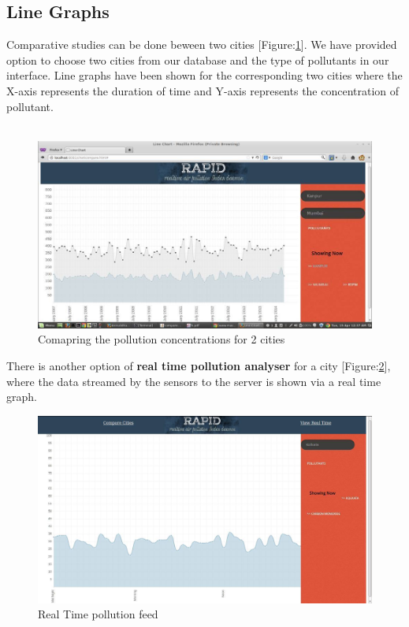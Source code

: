 \documentclass[twocolumn]{article}
\begin{document}
\subsection{Line Graphs}
Comparative studies can be done beween two cities [Figure:\ref{fig:compare}]. We have provided option to choose two cities from our database and the type of pollutants in our interface. Line graphs have been shown for the corresponding two cities where the X-axis represents the duration of time and Y-axis represents the concentration of pollutant.\\\\
\begin{figure}[t]
	\centering 
	\includegraphics[width=0.95\columnwidth]{compare.jpg} 
	\caption{ Comapring the pollution concentrations for 2 cities} 
	\label{fig:compare} 
	\end{figure} 
\noindent
There is another option of \textbf{real time pollution analyser} for a city [Figure:\ref{fig:one}], where the data streamed by the sensors to the server is shown via a real time graph. 
\begin{figure}[t]
	\centering 
	\includegraphics[width=0.95\columnwidth]{one.jpg} 
	\caption{Real Time pollution feed} 
	\label{fig:one} 
	\end{figure} 
\end{document}
